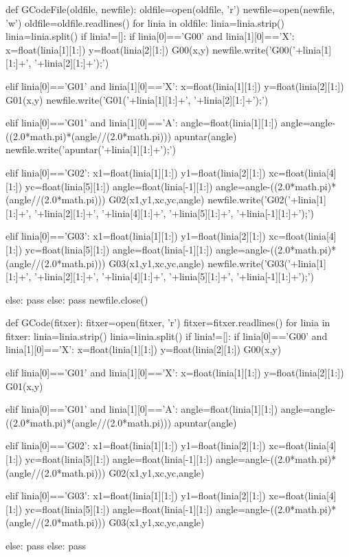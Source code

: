 \begin{python}
	
	def GCodeFile(oldfile, newfile):
		oldfile=open(oldfile, 'r')
		newfile=open(newfile, 'w')
		oldfile=oldfile.readlines()
		for linia in oldfile:
			linia=linia.strip()
			linia=linia.split()
			if linia!=[]:
				if linia[0]=='G00' and linia[1][0]=='X':
					x=float(linia[1][1:])
					y=float(linia[2][1:])
					G00(x,y)
					newfile.write('G00('+linia[1][1:]+', '+linia[2][1:]+');\n')
			
				elif linia[0]=='G01' and linia[1][0]=='X':
					x=float(linia[1][1:])
					y=float(linia[2][1:])
					G01(x,y)
					newfile.write('G01('+linia[1][1:]+', '+linia[2][1:]+');\n')
				
				elif linia[0]=='G01' and linia[1][0]=='A':
					angle=float(linia[1][1:])
					angle=angle-((2.0*math.pi)*(angle//(2.0*math.pi)))
					apuntar(angle)
					newfile.write('apuntar('+linia[1][1:]+');\n')
				
				elif linia[0]=='G02':
					x1=float(linia[1][1:])
					y1=float(linia[2][1:])
					xc=float(linia[4][1:])
					yc=float(linia[5][1:])
					angle=float(linia[-1][1:])
					angle=angle-((2.0*math.pi)*(angle//(2.0*math.pi)))
					G02(x1,y1,xc,yc,angle)
					newfile.write('G02('+linia[1][1:]+', '+linia[2][1:]+', '+linia[4][1:]+', '+linia[5][1:]+', '+linia[-1][1:]+');\n')
				
				elif linia[0]=='G03':
					x1=float(linia[1][1:])
					y1=float(linia[2][1:])
					xc=float(linia[4][1:])
					yc=float(linia[5][1:])
					angle=float(linia[-1][1:])
					angle=angle-((2.0*math.pi)*(angle//(2.0*math.pi)))
					G03(x1,y1,xc,yc,angle)
					newfile.write('G03('+linia[1][1:]+', '+linia[2][1:]+', '+linia[4][1:]+', '+linia[5][1:]+', '+linia[-1][1:]+');\n')
				
				else:
					pass
			else:
				pass
		newfile.close()
	
	
	def GCode(fitxer):
		fitxer=open(fitxer, 'r')
		fitxer=fitxer.readlines()
		for linia in fitxer:
			linia=linia.strip()
			linia=linia.split()
			if linia!=[]:
				if linia[0]=='G00' and linia[1][0]=='X':
					x=float(linia[1][1:])
					y=float(linia[2][1:])
					G00(x,y)
				
				
				elif linia[0]=='G01' and linia[1][0]=='X':
					x=float(linia[1][1:])
					y=float(linia[2][1:])
					G01(x,y)
				
				
				elif linia[0]=='G01' and linia[1][0]=='A':
					angle=float(linia[1][1:])
					angle=angle-((2.0*math.pi)*(angle//(2.0*math.pi)))
					apuntar(angle)
				
				
				elif linia[0]=='G02':
					x1=float(linia[1][1:])
					y1=float(linia[2][1:])
					xc=float(linia[4][1:])
					yc=float(linia[5][1:])
					angle=float(linia[-1][1:])
					angle=angle-((2.0*math.pi)*(angle//(2.0*math.pi)))
					G02(x1,y1,xc,yc,angle)
				
				
				elif linia[0]=='G03':
					x1=float(linia[1][1:])
					y1=float(linia[2][1:])
					xc=float(linia[4][1:])
					yc=float(linia[5][1:])
					angle=float(linia[-1][1:])
					angle=angle-((2.0*math.pi)*(angle//(2.0*math.pi)))
					G03(x1,y1,xc,yc,angle)
			
		
				else:
					pass
			else:
				pass
\end{python}

